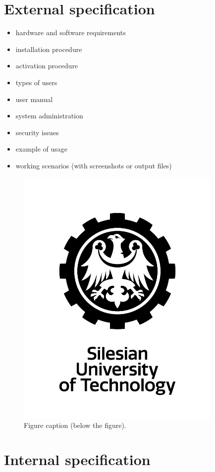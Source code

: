 \documentclass[a4paper,twoside,12pt]{book}
\begin{document}
\chapter{External specification}
\begin{itemize}
\item hardware and software requirements
\item installation procedure
\item activation procedure
\item types of users
\item user manual
\item system administration
\item security issues
\item example of usage
\item working scenarios (with screenshots or output files)
\end{itemize}

\begin{figure}
\centering
\includegraphics[width=10cm]{logo_eng.jpg}
\caption{Figure caption (below the figure).}
\label{fig:2}
\end{figure}


\chapter{Internal specification}
\end{document}
